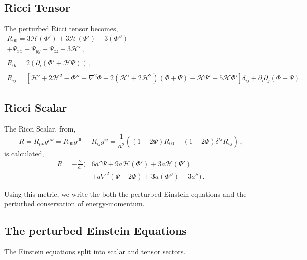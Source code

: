 \documentclass{book}
\begin{document}
	\subsection*{Ricci Tensor}
	The perturbed Ricci tensor becomes,
	\begin{equation}
		\begin{array}{c}
			R_{00} =
			3\mathcal{H}\left( \Phi' \right)
			+ 3\mathcal{H}\left( \Psi'\right)
			+ 3\left( \Phi''\right)
			\, \\
			+  \Psi_{xx}
			+  \Psi_{yy}
			+  \Psi_{zz}
			- 3\mathcal{H}' \, , \\
			\,  \\
			R_{0i} =
			2\left(
			\partial_i (\Phi'+\mathcal{H}\Psi) \right) \, ,		\\ 
			\,  \\
			R_{ij} =\left[ \mathcal{H}' +2\mathcal{H}^2 -\Phi'' +\nabla^2 \Phi -2(\mathcal{H}'+2\mathcal{H}^2)(\Phi+\Psi)-\mathcal{H}\Psi'-5\mathcal{H}\Phi' \right] \delta_{ij} +\partial_i \partial_j (\Phi-\Psi) \, .
		\end{array}
	\end{equation}
	\subsection*{Ricci Scalar}
	The Ricci Scalar, from,
	\begin{equation*}
		R=R_{\mu\nu}g^{\mu\nu}=R_{00}g^{00}+R_{ij}g^{ij}=\frac{1}{a^2}\left( (1-2\Psi)R_{00}-(1+2\Phi)\delta^{ij}R_{ij} \right) \, ,
	\end{equation*}
	is calculated,
	\begin{equation*}
		\begin{aligned}
			R = -\frac{2}{a^3} \Big(
			& 6 a'' \Psi
			+ 9a\mathcal{H}(  \Phi')
			+ 3a\mathcal{H}(  \Psi')
			\\
			\, & +a\nabla^2(\Psi-2\Phi)
			+ 3a( \Phi'')	- 3a'' 
			\Big) \, .
		\end{aligned}
	\end{equation*}
	
	Using this metric, we write the both the perturbed Einstein equations and the perturbed conservation of energy-momentum.
	\subsection{The perturbed Einstein Equations}
	The Einstein equations split into scalar and tensor sectors.
\end{document}
